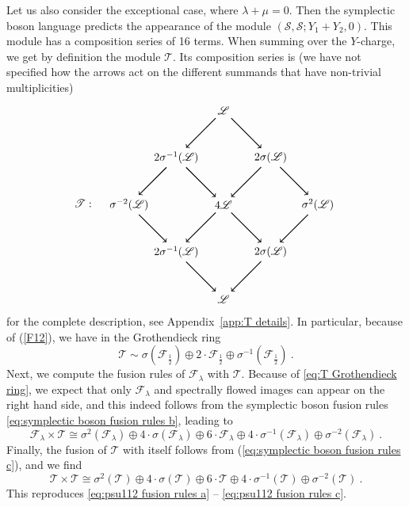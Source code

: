 \documentclass[12pt,a4paper]{article}
\newcommand{\be}{\begin{equation}}
\newcommand{\ee}{\end{equation}}
\begin{document}
Let us also consider the exceptional case, where $\lambda+\mu=0$. Then the symplectic boson language predicts the appearance of the module $(\mathscr{S},\mathscr{S};Y_1+Y_2,0)$. This module has a composition series of 16 terms. When summing over the $Y$-charge, we get by definition the module $\mathscr{T}$. Its composition series is (we have not specified how the arrows act on the different summands that have non-trivial multiplicities)
\be 
\mathscr{T}:\quad
\begin{tikzpicture}[baseline={([yshift=-.5ex]current bounding box.center)}]
\node (top) at (0,3) {$\mathscr{L}$};
\node (right) at (3,0) {$\sigma^2(\mathscr{L})$};
\node (left) at (-3,0) {$\sigma^{-2}(\mathscr{L})$};
\node (bottom) at (0,-3) {$\mathscr{L}$};
\node (topright) at (1.5,1.5) {$2 \sigma(\mathscr{L})$};
\node (topleft) at (-1.5,1.5) {$2 \sigma^{-1}(\mathscr{L})$};
\node (bottomright) at (1.5,-1.5) {$2 \sigma(\mathscr{L})$};
\node (bottomleft) at (-1.5,-1.5) {$2 \sigma^{-1}(\mathscr{L})$};
\node (center) at (0,0) {$4\mathscr{L}$};
\draw[thick,->] (right) to (bottomright);
\draw[thick,->] (left) to  (bottomleft);
\draw[thick,->] (bottomright) to (bottom);
\draw[thick,->] (bottomleft) to  (bottom);
\draw[thick,->] (top) to  (topleft);
\draw[thick,->] (top) to (topright);
\draw[thick,->] (topright) to  (right);
\draw[thick,->] (topleft) to (left);
\draw[thick,->] (topleft) to (center);
\draw[thick,->] (topright) to (center);
\draw[thick,->] (center) to (bottomleft);
\draw[thick,->] (center) to (bottomright);
\end{tikzpicture} \label{eq:composition diagram T}
\ee
for the complete description, see Appendix~\ref{app:T details}.
In particular, because of (\ref{F12}), we have in the Grothendieck ring
\be 
\mathscr{T} \sim \sigma(\mathscr{F}_{\frac{1}{2}}) \oplus 2\cdot \mathscr{F}_{\frac{1}{2}} \oplus \sigma^{-1}(\mathscr{F}_{\frac{1}{2}})\ . \label{eq:T Grothendieck ring}
\ee
Next, we compute the fusion rules of $\mathscr{F}_\lambda$ with $\mathscr{T}$. Because of \eqref{eq:T Grothendieck ring}, we expect that only $\mathscr{F}_\lambda$ and spectrally flowed images can appear on the right hand side, and this indeed follows from the symplectic boson fusion rules \eqref{eq:symplectic boson fusion rules b}, leading to 
\be 
\mathscr{F}_\lambda \times \mathscr{T} \cong \sigma^2(\mathscr{F}_\lambda) \oplus 4\cdot \sigma(\mathscr{F}_\lambda)\oplus 6\cdot \mathscr{F}_\lambda \oplus 4\cdot \sigma^{-1}(\mathscr{F}_\lambda) \oplus \sigma^{-2}(\mathscr{F}_\lambda)\ .
\ee
Finally, the fusion of $\mathscr{T}$ with itself follows from (\ref{eq:symplectic boson fusion rules c}), and we find 
\be 
\mathscr{T} \times \mathscr{T} \cong \sigma^2(\mathscr{T}) \oplus 4 \cdot \sigma(\mathscr{T}) \oplus 6 \cdot \mathscr{T} \oplus 4 \cdot \sigma^{-1}(\mathscr{T})\oplus \sigma^{-2}(\mathscr{T})\ .
\ee
This reproduces \eqref{eq:psu112 fusion rules a} -- \eqref{eq:psu112 fusion rules c}.
\end{document}
